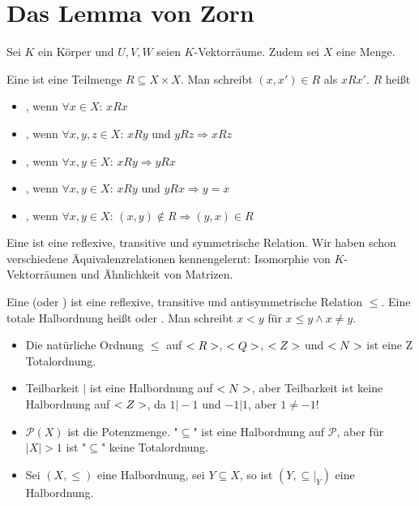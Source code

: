 \section{Das Lemma von Zorn}

Sei $K$ ein Körper und $U,V,W$ seien $K$-Vektorräume. Zudem sei $X$ eine Menge.

\begin{definition}[Relation]
	Eine  ist eine Teilmenge $R\subseteq X\times X$. Man schreibt $(x,x')\in R$ als $xRx'$. $R$ heißt
	\begin{itemize}
		\item {}, wenn $\forall  x\in X$: $xRx$
		\item {}, wenn $\forall x,y,z\in X$: $xRy$ und $yRz\Rightarrow xRz$
		\item {}, wenn $\forall x,y\in X$: $xRy\Rightarrow yRx$
		\item {}, wenn $\forall x,y\in X$: $xRy$ und $yRx\Rightarrow y=x$
		\item {}, wenn $\forall x,y\in X$: $(x,y)\notin R\Rightarrow (y,x)\in R$
	\end{itemize}
\end{definition}

\begin{example}[Äquivalenzrelation]
	Eine  ist eine reflexive, transitive und symmetrische Relation. Wir haben schon verschiedene Äquivalenzrelationen kennengelernt: Isomorphie von $K$-Vektorräumen und Ähnlichkeit von Matrizen.
\end{example}

\begin{definition}[Halbordnung]
	Eine  (oder ) ist eine reflexive, transitive und antisymmetrische Relation $\le$. Eine totale Halbordnung heißt  oder . Man schreibt $x<y$ für $x\le y\land x\neq y$.
\end{definition}

\begin{example}
	\begin{itemize}
		\item Die natürliche Ordnung $\le$ auf $<R>$, $<Q>$, $<Z>$ und $<N>$ ist eine Z
		Totalordnung.
		\item Teilbarkeit $\vert$ ist eine Halbordnung auf $<N>$, aber Teilbarkeit ist keine Halbordnung auf $<Z>$, da $1\vert -1$ und $-1\vert 1$, aber $1\neq -1$!
		\item $\mathcal{P}(X)$ ist die Potenzmenge. "$\subseteq$" ist eine Halbordnung auf $\mathcal{P}$, aber für $\vert X\vert>1$ ist "$\subseteq$" keine Totalordnung.
		\item Sei $(X,\le)$ eine Halbordnung, sei $Y\subseteq X$, so ist $(Y,\subseteq\vert_Y)$ eine Halbordnung.
	\end{itemize}
\end{example}

